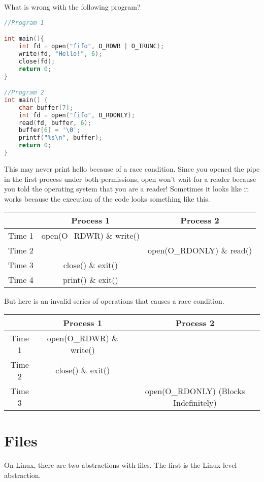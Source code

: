 What is wrong with the following program?

\begin{lstlisting}[language=C]
//Program 1

int main(){
    int fd = open("fifo", O_RDWR | O_TRUNC);
    write(fd, "Hello!", 6);
    close(fd);
    return 0;
}

//Program 2
int main() {
    char buffer[7];
    int fd = open("fifo", O_RDONLY);
    read(fd, buffer, 6);
    buffer[6] = '\0';
    printf("%s\n", buffer);
    return 0;
}
\end{lstlisting}

This may never print hello because of a race condition.
Since you opened the pipe in the first process under both permissions, open won't wait for a reader because you told the operating system that you are a reader!
Sometimes it looks like it works because the execution of the code looks something like this.

\begin{tabular}{|c|c|c|}
  & Process 1 & Process 2 \\ \hline
  Time 1 & open(O\_RDWR) \& write() & \\
  Time 2 & & open(O\_RDONLY) \& read() \\
  Time 3 & close() \& exit() & \\
  Time 4 & print() \& exit() & \\
\end{tabular}

But here is an invalid series of operations that causes a race condition.

\begin{tabular}{|c|c|c|}
  & Process 1 & Process 2 \\ \hline
  Time 1 & open(O\_RDWR) \& write() & \\
  Time 2 & close() \& exit() & \\
  Time 3 & & open(O\_RDONLY) (Blocks Indefinitely) \\
\end{tabular}

\section{Files}

On Linux, there are two abstractions with files. The first is the Linux  level abstraction.

